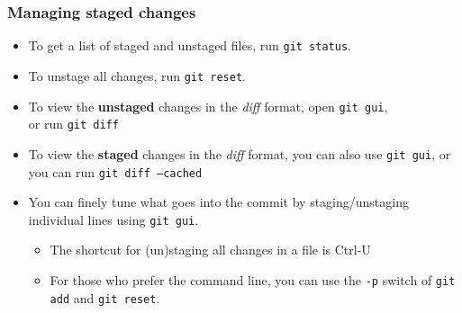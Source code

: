 \begin{frame}

\frametitle{Managing staged changes}


	\begin{itemize}	
	
	\item To get a list of staged and unstaged files, run \texttt{git status}.
	\item To unstage all changes, run \texttt{git reset}.
	\item To view the \textbf{unstaged} changes in the \textit{diff} format, open \texttt{git gui}, 
	\\or run \texttt{git diff}

	\item To view the \textbf{staged} changes in the \textit{diff} format, you can also use \texttt{git gui}, or you can run \texttt{git diff --cached}
	
	\item You can finely tune what goes into the commit by staging/unstaging individual lines using \texttt{git gui}.
	\begin{itemize}	
	\item The shortcut for (un)staging all changes in a file is Ctrl-U
	\item For those who prefer the command line, you can use the \texttt{-p} switch of \texttt{git add} and \texttt{git reset}.
	\end{itemize}
	\end{itemize}
	
\end{frame}


